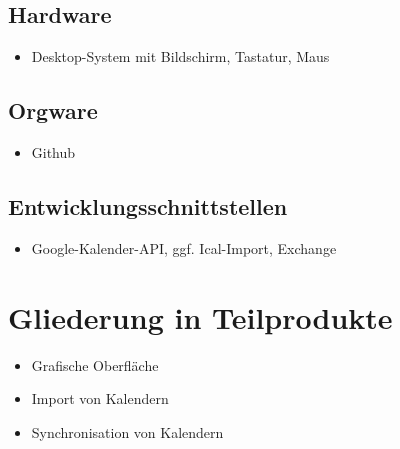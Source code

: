 \documentclass[a4paper]{article}
\begin{document}
    \subsection{Hardware}
	      \begin{itemize}
	      	\item Desktop-System mit Bildschirm, Tastatur, Maus
	      \end{itemize}
    \subsection{Orgware}
	      \begin{itemize}
					\item Github
	      \end{itemize}
    \subsection{Entwicklungsschnittstellen}
	      \begin{itemize}
	      	\item Google-Kalender-API, ggf. Ical-Import, Exchange
	      \end{itemize}

  \section{Gliederung in Teilprodukte}
    \begin{itemize}
      \item Grafische Oberfläche
		  \item Import von Kalendern
		  \item Synchronisation von Kalendern
    \end{itemize}
\end{document}
